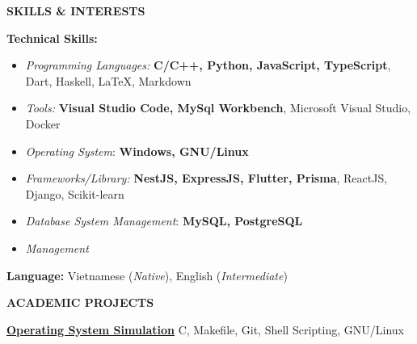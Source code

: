 \documentclass[a4paper,10pt]{article}
\begin{document}
\vspace{10pt}

\begin{center}
    \textbf{SKILLS \& INTERESTS} \hrulefill
\end{center}
\textbf{Technical Skills:} %

\begin{itemize}[noitemsep, topsep=0pt, partopsep=0pt, parsep=0pt]
    \item \textit{Programming Languages:} \textbf{C/C++, Python, JavaScript, TypeScript}, Dart, Haskell, \LaTeX, Markdown
    \item \textit{Tools:} \textbf{Visual Studio Code, MySql Workbench}, Microsoft Visual Studio, Docker
    \item \textit{Operating System}: \textbf{Windows, GNU/Linux}
    \item \textit{Frameworks/Library:} \textbf{NestJS, ExpressJS, Flutter, Prisma}, ReactJS, Django, Scikit-learn 
    \item \textit{Database System Management}: \textbf{MySQL, PostgreSQL}
    \item \textit{Management}
\end{itemize}
\vspace{6pt}
\textbf{Language:} Vietnamese (\textit{Native}), English (\textit{Intermediate})

\vspace{10pt}

\begin{center}
    \textbf{ACADEMIC PROJECTS} \hrulefill
\end{center}

\textbf{\href{https://github.com/mtriSE/Operating-Systems-Simulation-HCMUT.git}{Operating System Simulation}}	\hfill C, Makefile, Git, Shell Scripting, GNU/Linux
\end{document}
